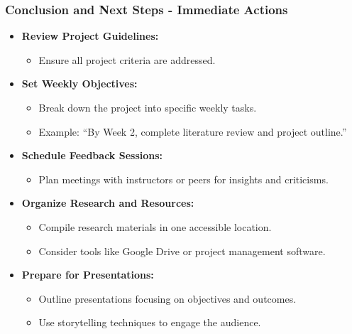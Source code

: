 \documentclass[aspectratio=169]{beamer}
\begin{document}
\begin{frame}[fragile]
    \frametitle{Conclusion and Next Steps - Immediate Actions}
    \begin{itemize}
        \item \textbf{Review Project Guidelines:}
        \begin{itemize}
            \item Ensure all project criteria are addressed.
        \end{itemize}
        
        \item \textbf{Set Weekly Objectives:}
        \begin{itemize}
            \item Break down the project into specific weekly tasks.
            \item Example: “By Week 2, complete literature review and project outline.”
        \end{itemize}
        
        \item \textbf{Schedule Feedback Sessions:}
        \begin{itemize}
            \item Plan meetings with instructors or peers for insights and criticisms.
        \end{itemize}
        
        \item \textbf{Organize Research and Resources:}
        \begin{itemize}
            \item Compile research materials in one accessible location.
            \item Consider tools like Google Drive or project management software.
        \end{itemize}
        
        \item \textbf{Prepare for Presentations:}
        \begin{itemize}
            \item Outline presentations focusing on objectives and outcomes.
            \item Use storytelling techniques to engage the audience.
        \end{itemize}
    \end{itemize}
\end{frame}
\end{document}
